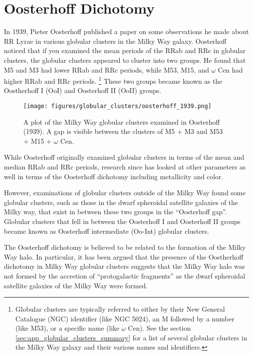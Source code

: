 \documentclass[]{article}
\begin{document}
\newpage

\section{Oosterhoff Dichotomy}

In 1939, Pieter Oosterhoff published a paper on some observations he made about RR Lyrae in various globular clusters in the Milky Way galaxy. Oosterhoff noticed that if you examined the mean periods of the RRab and RRc in globular clusters, the globular clusters appeared to cluster into two groups. He found that M5 and M3 had lower RRab and RRc periods, while M53, M15, and $\omega$ Cen had higher RRab and RRc periods. \footnote{Globular clusters are typically referred to either by their New General Catalogue (NGC) identifier (like NGC 5024), an M followed by a number (like M53), or a specific name (like $\omega$ Cen). See the section \ref{sec:app_globular_clusters_summary}  for a list of several globular clusters in the Milky Way galaxy and their various names and identifiers.} \cite{oosterhoff_1939} These two groups became known as the Oostherhoff I (OoI) and Oosterhoff II (OoII) groups. \cite{clement_2000}

\begin{figure}
	\centering
	\texttt{[image: figures/globular\_clusters/oosterhoff\_1939.png]}
	\caption{A plot of the Milky Way globular clusters examined in Oosterhoff (1939). \cite{oosterhoff_1939} A gap is visible between the clusters of M5 + M3 and M53 + M15 + $\omega$ Cen.}
	\label{fig:oosterhoff_1939_globular_clusters}
\end{figure}

While Oosterhoff originally examined globular clusters in terms of the mean and median RRab and RRc periods, research since has looked at other parameters as well in terms of the Oosterhoff dichotomy including metallicity and color. \cite{clement_2000}

However, examinations of globular clusters outside of the Milky Way found some globular clusters, such as those in the dwarf spheroidal satellite galaxies of the Milky way, that exist in between these two groups in the ``Oosterhoff gap''. \cite{szczygiel_2009, catelan_2009, cusano_2016, joo_2018} Globular clusters that fell in between the Oosterhoff I and Oosterhoff II groups became known as Oosterhoff intermediate (Oo-Int) globular clusters.

The Oosterhoff dichotomy is believed to be related to the formation of the Milky Way halo. \cite{jang_2015} In particular, it has been argued that the presence of the Oostherhoff dichotomy in Milky Way globular clusters suggests that the Milky Way halo was not formed by the accretion of ``protogalactic fragments'' as the dwarf spheroidal satellite galaxies of the Milky Way were formed. \cite{catelan_2009}
\end{document}

